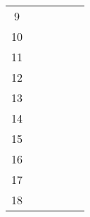 \begin{table}[ht]
\begin{tabular}{c|lllll}
    9                        &                                          &                                           &                                                &                                    &                                      \\
    10                       &                                          &                                           &                                                &                                    &                                      \\
    11                       &                                          &                                           &                                                &                                    &                                      \\
    12                       &                                          &                                           &                                                &                                    &                                      \\
    13                       &                                          &                                           &                                                &                                    &                                      \\
    14                       &                                          &                                           &                                                &                                    &                                      \\
    15                       &                                          &                                           &                                                &                                    &                                      \\
    16                       &                                          &                                           &                                                &                                    &                                      \\
    17                       &                                          &                                           &                                                &                                    &                                      \\
    18                       &                                          &                                           &                                                &                                    &                                      \\

\end{tabular}
\end{table}

